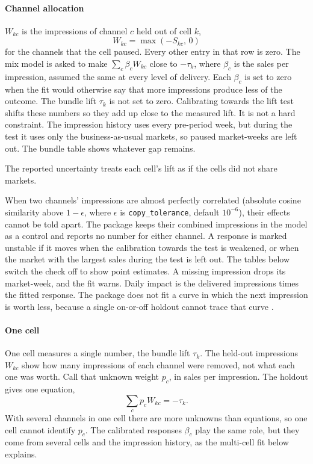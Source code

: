 \documentclass[preprint,12pt]{elsarticle}
\begin{document}
\paragraph{Channel allocation}
$W_{kc}$ is the impressions of channel $c$ held out of cell $k$,
\begin{equation}
\label{eq:withheld}
W_{kc} = \max(-S_{kc},\, 0)
\end{equation}
for the channels that the cell paused. Every other entry in that row is zero. The mix model is asked to make $\sum_{c} \beta_{c} W_{kc}$ close to $-\tau_{k}$, where $\beta_{c}$ is the sales per impression, assumed the same at every level of delivery. Each $\beta_{c}$ is set to zero when the fit would otherwise say that more impressions produce less of the outcome. The bundle lift $\tau_{k}$ is not set to zero. Calibrating towards the lift test shifts these numbers so they add up close to the measured lift. It is not a hard constraint. The impression history uses every pre-period week, but during the test it uses only the business-as-usual markets, so paused market-weeks are left out. The bundle table shows whatever gap remains.

The reported uncertainty treats each cell's lift as if the cells did not share markets.

When two channels' impressions are almost perfectly correlated (absolute cosine similarity above $1-\epsilon$, where $\epsilon$ is \texttt{copy\_\allowbreak tolerance}, default $10^{-6}$), their effects cannot be told apart. The package keeps their combined impressions in the model as a control and reports no number for either channel. A response is marked unstable if it moves when the calibration towards the test is weakened, or when the market with the largest sales during the test is left out. The tables below switch the check off to show point estimates. A missing impression drops its market-week, and the fit warns. Daily impact is the delivered impressions times the fitted response. The package does not fit a curve in which the next impression is worth less, because a single on-or-off holdout cannot trace that curve \cite{hanssens2001,jin2017}.

\paragraph{One cell}
One cell measures a single number, the bundle lift $\tau_{k}$. The held-out impressions $W_{kc}$ show how many impressions of each channel were removed, not what each one was worth. Call that unknown weight $p_{c}$, in sales per impression. The holdout gives one equation,
\begin{equation}
\label{eq:one-bundle}
\sum_{c} p_{c} W_{kc} = -\tau_{k}.
\end{equation}
With several channels in one cell there are more unknowns than equations, so one cell cannot identify $p_{c}$. The calibrated responses $\beta_{c}$ play the same role, but they come from several cells and the impression history, as the multi-cell fit below explains.
\end{document}
